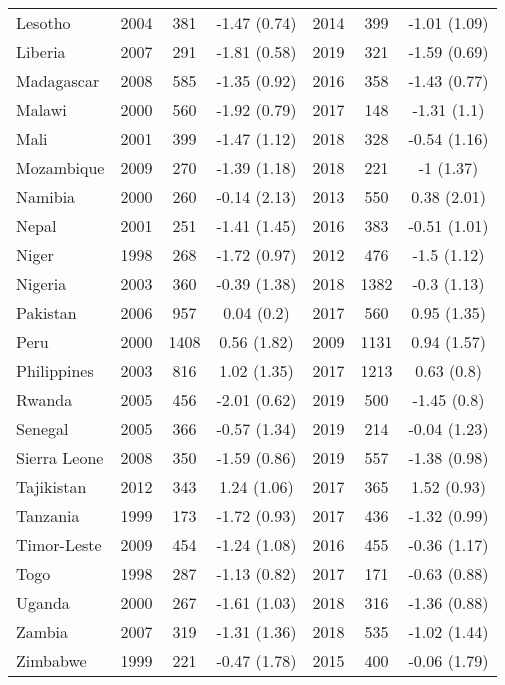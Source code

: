 \begin{tabular}{l | ccc | ccc}
 Lesotho & 2004 & 381 & -1.47 (0.74)  & 2014 & 399 & -1.01 (1.09)   \\ 
 Liberia & 2007 & 291 & -1.81 (0.58)  & 2019 & 321 & -1.59 (0.69)   \\ 
 Madagascar & 2008 & 585 & -1.35 (0.92)  & 2016 & 358 & -1.43 (0.77)   \\ 
 Malawi & 2000 & 560 & -1.92 (0.79)  & 2017 & 148 & -1.31 (1.1)   \\ 
 Mali & 2001 & 399 & -1.47 (1.12)  & 2018 & 328 & -0.54 (1.16)   \\ 
 Mozambique & 2009 & 270 & -1.39 (1.18)  & 2018 & 221 & -1 (1.37)   \\ 
 Namibia & 2000 & 260 & -0.14 (2.13)  & 2013 & 550 & 0.38 (2.01)   \\ 
 Nepal & 2001 & 251 & -1.41 (1.45)  & 2016 & 383 & -0.51 (1.01)   \\ 
 Niger & 1998 & 268 & -1.72 (0.97)  & 2012 & 476 & -1.5 (1.12)   \\ 
 Nigeria & 2003 & 360 & -0.39 (1.38)  & 2018 & 1382 & -0.3 (1.13)   \\ 
 Pakistan & 2006 & 957 & 0.04 (0.2)  & 2017 & 560 & 0.95 (1.35)   \\ 
 Peru & 2000 & 1408 & 0.56 (1.82)  & 2009 & 1131 & 0.94 (1.57)   \\ 
 Philippines & 2003 & 816 & 1.02 (1.35)  & 2017 & 1213 & 0.63 (0.8)   \\ 
 Rwanda & 2005 & 456 & -2.01 (0.62)  & 2019 & 500 & -1.45 (0.8)   \\ 
 Senegal & 2005 & 366 & -0.57 (1.34)  & 2019 & 214 & -0.04 (1.23)   \\ 
 Sierra Leone & 2008 & 350 & -1.59 (0.86)  & 2019 & 557 & -1.38 (0.98)   \\ 
 Tajikistan & 2012 & 343 & 1.24 (1.06)  & 2017 & 365 & 1.52 (0.93)   \\ 
 Tanzania & 1999 & 173 & -1.72 (0.93)  & 2017 & 436 & -1.32 (0.99)   \\ 
 Timor-Leste & 2009 & 454 & -1.24 (1.08)  & 2016 & 455 & -0.36 (1.17)   \\ 
 Togo & 1998 & 287 & -1.13 (0.82)  & 2017 & 171 & -0.63 (0.88)   \\ 
 Uganda & 2000 & 267 & -1.61 (1.03)  & 2018 & 316 & -1.36 (0.88)   \\ 
 Zambia & 2007 & 319 & -1.31 (1.36)  & 2018 & 535 & -1.02 (1.44)   \\ 
 Zimbabwe & 1999 & 221 & -0.47 (1.78)  & 2015 & 400 & -0.06 (1.79)   \\ 
 \hline 
\end{tabular}